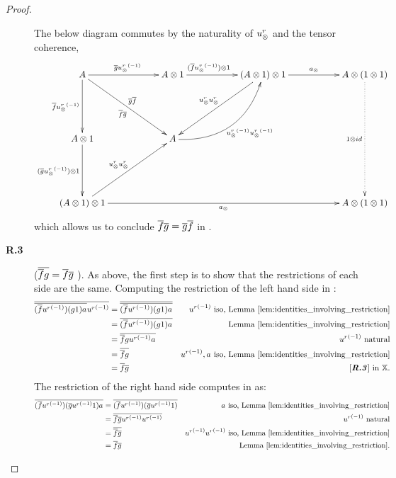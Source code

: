 \begin{proof}
\begin{description}

      The below diagram commutes by the naturality of $u_{\otimes}^r$ and the tensor coherence,
      \[
        \xymatrix @C=55pt @R=55pt{
          A \ar[r]^{\restr{g} \inv{\usr}}
            \ar[dr]_{\restr{f}\restr{g}}^{\restr{g}\restr{f}}
            \ar[d]_{\restr{f}\inv{\usr}}
            &A\*1 \ar[r]^(.4){(\rst{f}\inv{\usr})\*1}
            & (A \*1) \* 1
            \ar[r]^{a_{\*}}  \ar[dl]_{\usr \usr}
            & A \* (1\*1) \ar@{.>}[dd]_{1\*id}\\ %
          A\*1 \ar[d]_{(\rst{g}\inv{\usr})\*1}
            &A \ar@/_25pt/[ur]_{\inv{\usr}\inv{\usr}} \\
          (A\*1)\*1 \ar[rrr]_{a_\*} \ar[ur]^{\usr \usr}
            &&& A \* (1\*1)
        }
      \]
      which allows us to conclude $\overline{f} \overline{g} = \overline{g} \overline{f}$ in \Xt.



    \item[\textbf{R.3}] ($\overline{\overline{f} g} = \overline{f} \overline{g}$ ). As above, the first step is
      to show that the restrictions of each side are the same. Computing the restriction of the left
      hand side in \X:
      \begin{align*}
        \rst{\restr{(\restr{f} \inv{\usr}) (g\* 1) a_{\*}} \inv{\usr}}
        & = \rst{\restr{(\restr{f} \inv{\usr}) (g\* 1) a_{\*}}} & \inv{\usr} 
          \text{ iso, Lemma \ref{lem:identities_involving_restriction}}\\
        & = \restr{(\restr{f} \inv{\usr}) (g\* 1) a_{\*}} & 
          \text{Lemma \ref{lem:identities_involving_restriction}}\\
        & = \restr{\restr{f} g \inv{\usr} a_{\*}} & \inv{\usr} \text{ natural}\\
        & = \restr{\restr{f} g } & \inv{\usr}, a_{\*} 
          \text{ iso, Lemma \ref{lem:identities_involving_restriction}}\\
        & = \restr{f} \rst{g} & \text{\rthree in }\X.
      \end{align*}
      The restriction of the right hand side computes in \X as:
      \begin{align*}
        \rst{(\restr{f} \inv{\usr}) (\rst{g} \inv{\usr}\* 1) a_{\*}}
        & = \rst{(\restr{f} \inv{\usr}) (\rst{g} \inv{\usr}\* 1) } &  a_{\*} 
          \text{ iso, Lemma \ref{lem:identities_involving_restriction}}\\
        & = \rst{\restr{f}  \rst{g} \inv{\usr}\inv{\usr} } &  \inv{\usr} \text{ natural}\\
        & = \rst{\restr{f}  \rst{g} } &\inv{\usr}\inv{\usr} 
          \text{ iso, Lemma \ref{lem:identities_involving_restriction}}\\
        & = \restr{f} \rst{g} & \text{Lemma \ref{lem:identities_involving_restriction}}.
      \end{align*}


\end{description}
\end{proof}
